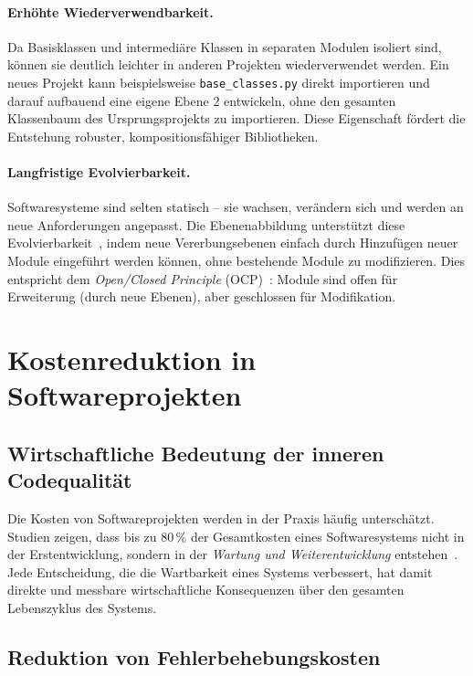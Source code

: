 ﻿\documentclass[a4paper,12pt]{article}
\begin{document}
\paragraph{Erhöhte Wiederverwendbarkeit.}
Da Basisklassen und intermediäre Klassen in separaten Modulen isoliert sind,
können sie deutlich leichter in anderen Projekten wiederverwendet werden. Ein
neues Projekt kann beispielsweise \texttt{base\_classes.py} direkt importieren
und darauf aufbauend eine eigene Ebene 2 entwickeln, ohne den gesamten
Klassenbaum des Ursprungsprojekts zu importieren. Diese Eigenschaft fördert
die Entstehung robuster, kompositionsfähiger Bibliotheken.

\paragraph{Langfristige Evolvierbarkeit.}
Softwaresysteme sind selten statisch -- sie wachsen, verändern sich und
werden an neue Anforderungen angepasst. Die Ebenenabbildung unterstützt diese
Evolvierbarkeit~\cite{lehman1997}, indem neue Vererbungsebenen einfach durch
Hinzufügen neuer Module eingeführt werden können, ohne bestehende Module zu
modifizieren. Dies entspricht dem \textit{Open/Closed Principle}
(OCP)~\cite{martin2017}: Module sind offen für Erweiterung (durch neue Ebenen),
aber geschlossen für Modifikation.

\section{Kostenreduktion in Softwareprojekten}

\subsection{Wirtschaftliche Bedeutung der inneren Codequalität}

Die Kosten von Softwareprojekten werden in der Praxis häufig unterschätzt.
Studien zeigen, dass bis zu 80\,\% der Gesamtkosten eines Softwaresystems nicht
in der Erstentwicklung, sondern in der \textit{Wartung und Weiterentwicklung}
entstehen~\cite{pressman2014}. Jede Entscheidung, die die Wartbarkeit eines
Systems verbessert, hat damit direkte und messbare wirtschaftliche Konsequenzen
über den gesamten Lebenszyklus des Systems.

\subsection{Reduktion von Fehlerbehebungskosten}
\end{document}

